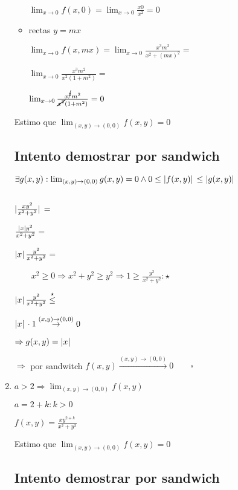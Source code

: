 \documentclass[../parcial.tex]{subfiles}
\begin{document}
\begin{enumerate}
\begin{itemize}
                    $\lim_{x\to0} f(x,0) = \lim_{x\to0} \frac{x0}{x^2} = 0$

                \item rectas $ y = mx$
                
                    $\lim_{x\to0} f(x,mx) = \lim_{x\to0} \frac{x^3m^2}{x^2+(mx)^2} = $

                    $ \lim_{x\to0} \frac{x^3m^2}{x^2(1+m^2)} = $

                    $ \lim_{x\to0} \frac{x^{\cancel{3}}m^2}{\cancel{x^2}(1+m^2)} = 0 $

            \end{itemize}

            Estimo que $\lim_{(x,y) \to (0,0)} f(x,y) = 0$

            \subsection*{Intento demostrar por sandwich}
        
            $ \exists g(x,y): \lim_{(x,y)\to(0,0)} g(x,y) = 0 \wedge 0 \leq \abs*{f(x,y)} \leq \abs*{g(x,y)} $

            $ $

            $ \abs*{\frac{xy^2}{x^2+y^2}} = $

            $ \frac{\abs*{x}y^2}{x^2+y^2} = $

            $ \abs*{x}\frac{y^2}{x^2+y^2} = $

            $ \qquad x^2 \geq 0 \Rightarrow x^2 + y^2 \geq y^2 \Rightarrow 1 \geq \frac{y^2}{x^2+y^2} : \star $

            $ \abs*{x}\frac{y^2}{x^2+y^2} \stackrel{\star}{\leq} $

            $ \abs*{x} \cdot 1 \stackrel{(x,y)\to(0,0)}{\to} 0$

            $ \Rightarrow g(x,y) = \abs*{x} $

            $ \Rightarrow $ por sandwitch $f(x,y) \stackrel{(x,y)\to(0,0)}{\to} 0 \qquad \square$

        \item $a > 2 \Rightarrow \lim_{(x,y) \to (0,0)} f(x,y)$

            $ a = 2 + k : k > 0$

            $ f(x,y) = \frac{xy^{2+k}}{x^2+y^2} $

            Estimo que $\lim_{(x,y) \to (0,0)} f(x,y) = 0$

            \subsection*{Intento demostrar por sandwich}
        

\end{enumerate}
\end{document}
